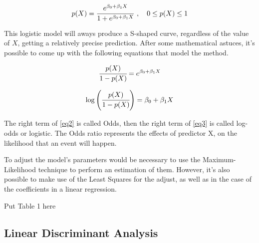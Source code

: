 \documentclass[conference]{IEEEtran}
\newcommand{\reviewUrgent}[1]{{\color{red} #1}} %
\begin{document}
\begin{equation}
   p(X) = \cfrac{e^{\beta_0 + \beta_1X}}{1+e^{\beta_0 + \beta_1X}} \hspace{0.15cm}, \hspace{0.35cm} 0\leq p(X) \leq 1 \label{eq1}
\end{equation}

This logistic model will aways produce a S-shaped curve, regardless of the value of $X$, 
getting a relatively precise prediction. After some mathematical astuces, it's possible 
to come up with the following equations that model the method.

\begin{equation}
    \cfrac{p(X)}{1-p(X)} = e^{\beta_0+\beta_1X} \label{eq2}
\end{equation}

\begin{equation}
    \log \left(\cfrac{p(X)}{1-p(X)}\right) = \beta_0+\beta_1X \label{eq3}
\end{equation}

The right term of \eqref{eq2} is called Odds, then the right term of \eqref{eq3} is 
called log-odds or logistic. The Odds ratio represents the effects of predictor X, on the
likelihood that an event will happen.

To adjust the model's parameters would be necessary to use
the Maximum-Likelihood technique to perform an estimation of them. However, it's also possible
to make use of the Least Squares for the adjust, as well as in the case of the 
coefficients in a linear regression.

\reviewUrgent{Put Table 1 here}


\subsection{Linear Discriminant Analysis}
\end{document}
